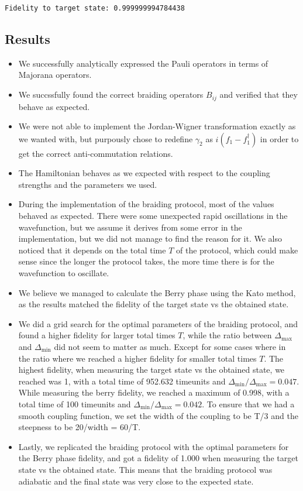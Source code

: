 \documentclass[11pt,landscape]{article}
\providecommand{\tightlist}{%
      \setlength{\itemsep}{0pt}\setlength{\parskip}{0pt}}
\begin{document}
    \begin{Verbatim}[commandchars=\\\{\}]
Fidelity to target state: 0.999999994784438
    \end{Verbatim}

    \subsection{Results}\label{results}

\begin{itemize}
\tightlist
\item
  We successfully analytically expressed the Pauli operators in terms of
  Majorana operators.
\item
  We succssfully found the correct braiding operators \(B_{ij}\) and
  verified that they behave as expected.
\item
  We were not able to implement the Jordan-Wigner transformation exactly
  as we wanted with, but purpously chose to redefine \(γ_2\) as
  \(i(f_1 - f_1^{†})\) in order to get the correct anti-commutation
  relations.
\item
  The Hamiltonian behaves as we expected with respect to the coupling
  strengths and the parameters we used.
\item
  During the implementation of the braiding protocol, most of the values
  behaved as expected. There were some unexpected rapid oscillations in
  the wavefunction, but we assume it derives from some error in the
  implementation, but we did not manage to find the reason for it. We
  also noticed that it depends on the total time \(T\) of the protocol,
  which could make sense since the longer the protocol takes, the more
  time there is for the wavefunction to oscillate.
\item
  We believe we managed to calculate the Berry phase using the Kato
  method, as the results matched the fidelity of the target state vs the
  obtained state.
\item
  We did a grid search for the optimal parameters of the braiding
  protocol, and found a higher fidelity for larger total times \(T\),
  while the ratio between \(Δ_{\max}\) and \(Δ_{\min}\) did not seem to
  matter as much. Except for some cases where in the ratio where we
  reached a higher fidelity for smaller total times \(T\). The highest
  fidelity, when measuring the target state vs the obtained state, we
  reached was 1, with a total time of 952.632 timeunits and
  \(Δ_{\min}/Δ_{\max}=0.047\). While measuring the berry fidelity, we
  reached a maximum of 0.998, with a total time of 100 timeunits and
  \(Δ_{\min}/Δ_{\max}=0.042\). To ensure that we had a smooth coupling
  function, we set the width of the coupling to be T/3 and the steepness
  to be 20/width = 60/T.
\item
  Lastly, we replicated the braiding protocol with the optimal
  parameters for the Berry phase fidelity, and got a fidelity of 1.000
  when measuring the target state vs the obtained state. This means that
  the braiding protocol was adiabatic and the final state was very close
  to the expected state.
\end{itemize}
\end{document}
